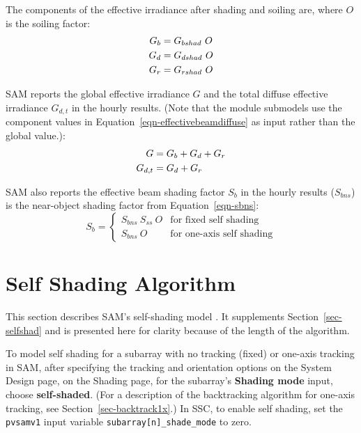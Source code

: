 \documentclass[12pt,letterpaper]{article}
\begin{document}
The components of the effective irradiance after shading and soiling are, where $O$ is the soiling factor:
\begin{align} \label{eqn-effectivebeamdiffuse}
G_b &= G_{bshad}~O \notag\\
G_d &= G_{dshad}~O\notag\\
G_r &=  G_{rshad}~O
\end{align}

SAM reports the global effective irradiance $G$ and the total diffuse effective irradiance $G_{d,t}$ in the hourly results. (Note that the module submodels use the component values in Equation~\ref{eqn-effectivebeamdiffuse} as input rather than the global value.):
\begin{align}
G &= G_b + G_d + G_r\notag\\
G_{d,t} & = G_d + G_r
\end{align}

SAM also reports the effective beam shading factor $S_b$ in the hourly results ($S_{bns}$) is the near-object shading factor from Equation~\ref{eqn-sbns}:
\begin{equation}
S_b = \left\{
\begin{array}{ll}
S_{bns}~S_{ss}~O &\text{for fixed self shading}\\
S_{bns}~O &\text{for one-axis self shading} 
\end{array}
\right.
\end{equation}

\chapter{Self Shading Algorithm}\label{sec-selfshadalg}

This section describes SAM's self-shading model \citep{deline2013a}. It supplements Section~\ref{sec-selfshad} and is presented here for clarity because of the length of the algorithm.

To model self shading for a subarray with no tracking (fixed) or one-axis tracking in SAM, after specifying the tracking and orientation options on the System Design page, on the Shading page, for the subarray's \textbf{Shading mode} input, choose \textbf{self-shaded}. (For a description of the backtracking algorithm for one-axis tracking, see Section~\ref{sec-backtrack1x}.) In SSC, to enable self shading, set the \texttt{pvsamv1} input variable \texttt{subarray[n]\_shade\_mode} to zero.
\end{document}

